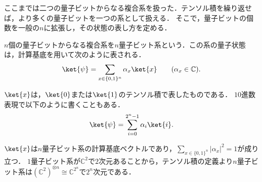 ここまでは二つの量子ビットからなる複合系を扱った．テンソル積を繰り返せば，より多くの量子ビットを一つの系として扱える．
そこで，量子ビットの個数を一般の$n$に拡張し，その状態の表し方を定める．
\begin{defi}[$n$量子ビット系]
  $n$個の量子ビットからなる複合系を$n$量子ビット系という．この系の量子状態は，計算基底を用いて次のように表される．
  \begin{equation*}
    \ket{\psi}=\sum_{x\in\{0,1\}^n}\alpha_x\ket{x}
    \qquad (\alpha_x\in\mathbb C).
  \end{equation*}
\end{defi}
$\ket{x}$は，$\ket{0}$または$\ket{1}$のテンソル積で表したものである．
$10$進数表現で以下のように書くこともある．
\[
  \ket{\psi} = \sum_{i=0}^{2^n-1}\alpha_i\ket{i}.
\]

$\ket{x}$は$n$量子ビット系の計算基底ベクトルであり，$\sum_{x\in\{0,1\}^n}|\alpha_x|^2=1$が成り立つ．
$1$量子ビット系が$\mathbb{C}^2$で$2$次元あることから，テンソル積の定義より$n$量子ビット系は$(\mathbb{C}^2)^{\otimes n} \cong \mathbb{C}^{2^{n}}$で$2^n$次元である．

